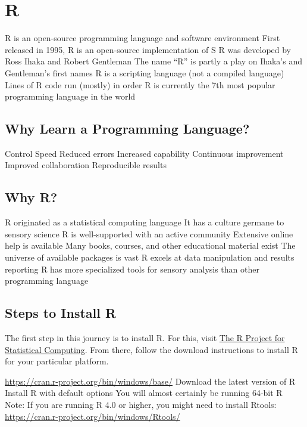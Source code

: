 \documentclass[
]{book}
\begin{document}
\hypertarget{r}{%
\section{R}\label{r}}

R is an open-source programming language and software environment
First released in 1995, R is an open-source implementation of S
R was developed by Ross Ihaka and Robert Gentleman
The name ``R'' is partly a play on Ihaka's and Gentleman's first names
R is a scripting language (not a compiled language)
Lines of R code run (mostly) in order
R is currently the 7th most popular programming language in the world

\hypertarget{why-learn-a-programming-language}{%
\subsection{Why Learn a Programming Language?}\label{why-learn-a-programming-language}}

Control
Speed
Reduced errors
Increased capability
Continuous improvement
Improved collaboration
Reproducible results

\hypertarget{why-r-1}{%
\subsection{Why R?}\label{why-r-1}}

R originated as a statistical computing language
It has a culture germane to sensory science
R is well-supported with an active community
Extensive online help is available
Many books, courses, and other educational material exist
The universe of available packages is vast
R excels at data manipulation and results reporting
R has more specialized tools for sensory analysis than other programming language

\hypertarget{steps-to-install-r}{%
\subsection{Steps to Install R}\label{steps-to-install-r}}

The first step in this journey is to install R. For this, visit \href{https://www.r-project.org/}{The R Project for Statistical Computing}. From there, follow the download instructions to install R for your particular platform.

\url{https://cran.r-project.org/bin/windows/base/}
Download the latest version of R
Install R with default options
You will almost certainly be running 64-bit R
Note: If you are running R 4.0 or higher, you might need to install Rtools:
\url{https://cran.r-project.org/bin/windows/Rtools/}
\end{document}
